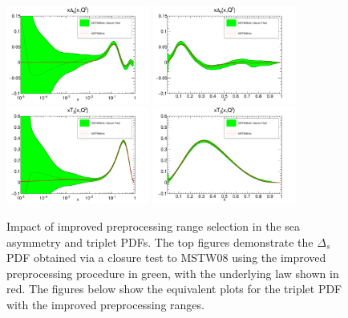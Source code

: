 \begin{figure}[!]
\centering
\includegraphics[width=0.42\textwidth]{7-PostLHC/figs/PreprocFixed/pdf_xDs_log_others.pdf}
\includegraphics[width=0.42\textwidth]{7-PostLHC/figs/PreprocFixed/pdf_xDs_others.pdf}
\includegraphics[width=0.42\textwidth]{7-PostLHC/figs/PreprocFixed/pdf_xT3_log_others.pdf}
\includegraphics[width=0.42\textwidth]{7-PostLHC/figs/PreprocFixed/pdf_xT3_others.pdf}
\caption[Impact of improved preprocessing range selection in the sea asymmetry and triplet PDFs]{Impact of improved preprocessing range selection in the sea asymmetry and triplet PDFs. The top figures demonstrate the $\Delta_s$ PDF obtained via a closure test to MSTW08 using the improved preprocessing procedure in green, with the underlying law shown in red. The figures below show the equivalent plots for the triplet PDF with the improved preprocessing ranges.}
\label{fig:preproc3}
\end{figure}
\clearpage

